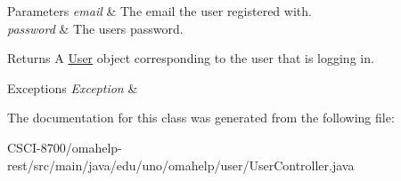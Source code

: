 \begin{DoxyParams}{Parameters}
{\em email} & The email the user registered with. \\
\hline
{\em password} & The user\textquotesingle{}s password. \\
\hline
\end{DoxyParams}
\begin{DoxyReturn}{Returns}
A \mbox{\hyperlink{classedu_1_1uno_1_1omahelp_1_1user_1_1_user}{User}} object corresponding to the user that is logging in. 
\end{DoxyReturn}

\begin{DoxyExceptions}{Exceptions}
{\em Exception} & \\
\hline
\end{DoxyExceptions}


The documentation for this class was generated from the following file\+:\begin{DoxyCompactItemize}
\item 
C\+S\+C\+I-\/8700/omahelp-\/rest/src/main/java/edu/uno/omahelp/user/User\+Controller.\+java\end{DoxyCompactItemize}
